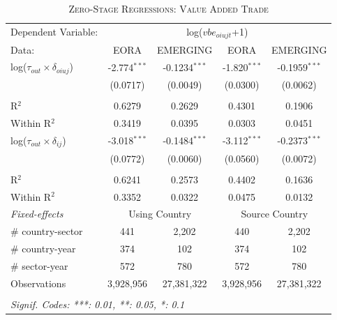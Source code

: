 \documentclass[a4paper]{article}
\begin{document}
\begin{table}[h!]
   \caption{\label{tab:ZS_FULL} \textsc{Zero-Stage Regressions: Value Added Trade}}
   \centering
   \begin{tabular}{lcccc}
      \tabularnewline \toprule
      Dependent Variable: & \multicolumn{4}{c}{log($vbe_{oiujt}$+1)}\\ \cmidrule(lr){2-5}
      Data:                               & EORA           & EMERGING        & EORA           & EMERGING \\   
      \midrule
      log($\tau_{out}\times \delta_{oiuj}$) & -2.774$^{***}$ & -0.1234$^{***}$ & -1.820$^{***}$ & -0.1959$^{***}$\\    
                                           & (0.0717)       & (0.0049)        & (0.0300)       & (0.0062)\\  \\   
      R$^2$                               & 0.6279         & 0.2629          & 0.4301         & 0.1906\\ 
      Within R$^2$                         & 0.3419         & 0.0395          & 0.0303         & 0.0451\\  
      \midrule
      log($\tau_{out}\times \delta_{ij}$)   & -3.018$^{***}$ & -0.1484$^{***}$ & -3.112$^{***}$ & -0.2373$^{***}$\\  
                                          & (0.0772)       & (0.0060)        & (0.0560)       & (0.0072)\\  \\
      R$^2$                               & 0.6241         & 0.2573          & 0.4402         & 0.1636\\  
      Within R$^2$                        & 0.3352         & 0.0322          & 0.0475         & 0.0132\\    
      \midrule
      \emph{Fixed-effects} & \multicolumn{2}{c}{Using Country} & \multicolumn{2}{c}{Source Country} \\
      \# country-sector      & 441            & 2,202             & 440            & 2,202\\  
      \# country-year               & 374            & 102             & 374            & 102\\   
      \# sector-year                & 572            & 780             & 572            & 780\\
     \midrule
      Observations                        & 3,928,956      & 27,381,322      & 3,928,956      & 27,381,322\\ 
      \bottomrule \\ [-0.9em]
      \multicolumn{5}{l}{\emph{Signif. Codes: ***: 0.01, **: 0.05, *: 0.1}}\\
   \end{tabular}
   \vspace{-1cm}
\end{table}
\FloatBarrier
\end{document}
